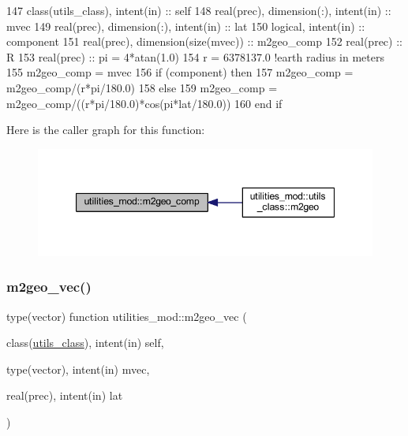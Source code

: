 \begin{DoxyCode}
147     \textcolor{keywordtype}{class}(utils\_class), \textcolor{keywordtype}{intent(in)} :: self
148     \textcolor{keywordtype}{real(prec)}, \textcolor{keywordtype}{dimension(:)}, \textcolor{keywordtype}{intent(in)} :: mvec    
149     \textcolor{keywordtype}{real(prec)}, \textcolor{keywordtype}{dimension(:)}, \textcolor{keywordtype}{intent(in)} :: lat
150     \textcolor{keywordtype}{logical}, \textcolor{keywordtype}{intent(in)} :: component
151     \textcolor{keywordtype}{real(prec)}, \textcolor{keywordtype}{dimension(size(mvec))} :: m2geo\_comp
152     \textcolor{keywordtype}{real(prec)} :: R
153     \textcolor{keywordtype}{real(prec)} :: pi = 4*atan(1.0)
154     r = 6378137.0 \textcolor{comment}{!earth radius in meters}
155     m2geo\_comp = mvec
156     \textcolor{keywordflow}{if} (component) \textcolor{keywordflow}{then}
157         m2geo\_comp = m2geo\_comp/(r*pi/180.0)
158     \textcolor{keywordflow}{else}
159         m2geo\_comp = m2geo\_comp/((r*pi/180.0)*cos(pi*lat/180.0))
160 \textcolor{keywordflow}{    end if}
\end{DoxyCode}
Here is the caller graph for this function\+:\nopagebreak
\begin{figure}[H]
\begin{center}
\leavevmode
\includegraphics[width=347pt]{namespaceutilities__mod_ae6b8a45b229e3f1f8c2b12dd74e7a2dd_icgraph}
\end{center}
\end{figure}
\mbox{\label{namespaceutilities__mod_a70b21b18c8633b7fd4c3057530d3f16f}} 
\subsubsection{\texorpdfstring{m2geo\+\_\+vec()}{m2geo\_vec()}}
{\footnotesize\ttfamily type(vector) function utilities\+\_\+mod\+::m2geo\+\_\+vec (\begin{DoxyParamCaption}\item[{class(\mbox{\hyperlink{structutilities__mod_1_1utils__class}{utils\+\_\+class}}), intent(in)}]{self,  }\item[{type(vector), intent(in)}]{mvec,  }\item[{real(prec), intent(in)}]{lat }\end{DoxyParamCaption})\hspace{0.3cm}{\ttfamily [private]}}



